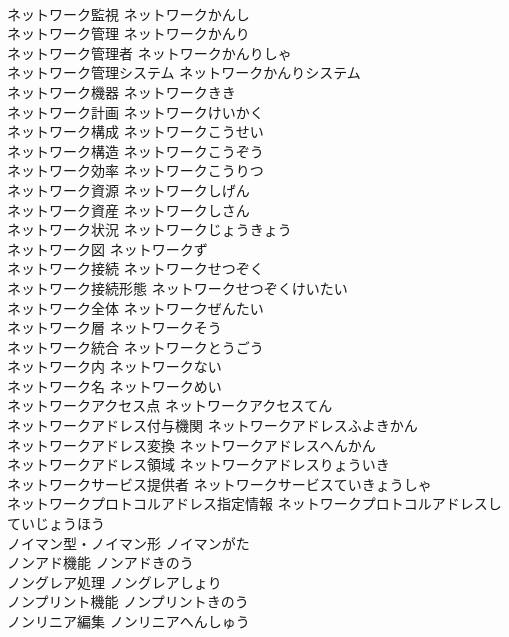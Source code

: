 \documentclass[8pt]{extreport}
\begin{document}
\begin{CJK}{UTF8}{min}
\\	ネットワーク監視	ネットワークかんし	
\\	ネットワーク管理	ネットワークかんり	
\\	ネットワーク管理者	ネットワークかんりしゃ	
\\	ネットワーク管理システム	ネットワークかんりシステム	
\\	ネットワーク機器	ネットワークきき	
\\	ネットワーク計画	ネットワークけいかく	
\\	ネットワーク構成	ネットワークこうせい	
\\	ネットワーク構造	ネットワークこうぞう	
\\	ネットワーク効率	ネットワークこうりつ	
\\	ネットワーク資源	ネットワークしげん	
\\	ネットワーク資産	ネットワークしさん	
\\	ネットワーク状況	ネットワークじょうきょう	
\\	ネットワーク図	ネットワークず	
\\	ネットワーク接続	ネットワークせつぞく	
\\	ネットワーク接続形態	ネットワークせつぞくけいたい	
\\	ネットワーク全体	ネットワークぜんたい	
\\	ネットワーク層	ネットワークそう	
\\	ネットワーク統合	ネットワークとうごう	
\\	ネットワーク内	ネットワークない	
\\	ネットワーク名	ネットワークめい	
\\	ネットワークアクセス点	ネットワークアクセスてん	
\\	ネットワークアドレス付与機関	ネットワークアドレスふよきかん	
\\	ネットワークアドレス変換	ネットワークアドレスへんかん	
\\	ネットワークアドレス領域	ネットワークアドレスりょういき	
\\	ネットワークサービス提供者	ネットワークサービスていきょうしゃ	
\\	ネットワークプロトコルアドレス指定情報	ネットワークプロトコルアドレスしていじょうほう	
\\	ノイマン型・ノイマン形	ノイマンがた	
\\	ノンアド機能	ノンアドきのう	
\\	ノングレア処理	ノングレアしょり	
\\	ノンプリント機能	ノンプリントきのう	
\\	ノンリニア編集	ノンリニアへんしゅう	

\end{CJK}
\end{document}
